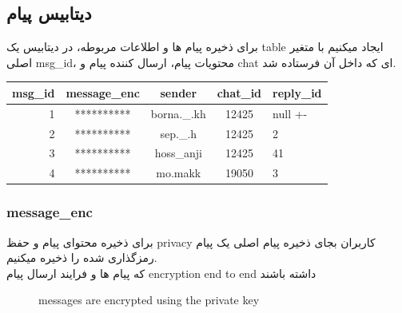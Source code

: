 \documentclass[12pt]{article}
\begin{document}
\subsection{دیتابیس پیام}
برای ذخیره پیام ها و  اطلاعات مربوطه، در دیتابیس یک table
ایجاد میکنیم با متغیر اصلی msg\_id،
محتویات پیام، ارسال کننده پیام و chat ای که
داخل آن فرستاده شد.\\
\begin{latin}
    \begin{table}[h]
        \centering
        \begin{tabular}{|r|c|c|c|l|}
            \hline
            msg\_id & message\_enc & sender      & chat\_id & reply\_id \\
            \hline
            1       & **********   & borna.\_.kh & 12425    & null  +-  \\
            2       & **********   & sep.\_.h    & 12425    & 2         \\
            3       & **********   & hoss\_anji  & 12425    & 41        \\
            4       & **********   & mo.makk     & 19050    & 3         \\
            \hline
        \end{tabular}
    \end{table}
\end{latin}
\subsubsection{message\_enc}
برای ذخیره محتوای پیام و حفظ privacy کاربران
بجای ذخیره پیام اصلی یک پیام رمزگذاری شده را ذخیره میکنیم.\\
که پیام ها و فرایند ارسال پیام encryption end to end
داشته باشند\\
\begin{latin}
    \begin{figure}[b]
        \caption{messages are encrypted using the private key}
    \end{figure}
\end{latin}
\end{document}
